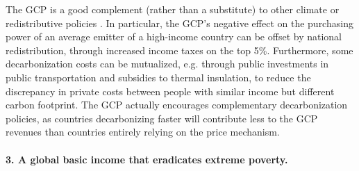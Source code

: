 \documentclass[12pt,english]{article}
\begin{document}
The GCP is a good complement (rather than a substitute) to other climate or redistributive policies \citep{stiglitz_addressing_2019}. In particular, the GCP's negative effect on the purchasing power of an average emitter of a high-income country can be offset by national redistribution, through increased income taxes on the top 5\%. Furthermore, some decarbonization costs can be mutualized, e.g. through public investments in public transportation and subsidies to thermal insulation, to reduce the discrepancy in private costs between people with similar income but different carbon footprint. The GCP actually encourages complementary decarbonization policies, as countries decarbonizing faster will contribute less to the GCP revenues than countries entirely relying on the price mechanism. %

\paragraph*{3. A global basic income that eradicates extreme poverty.}
\end{document}
